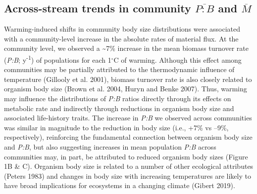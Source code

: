 \documentclass[
]{article}
\numberwithin{equation}
\begin{document}
\hypertarget{across-stream-trends-in-community-overlinepb-and-overlinem}{%
\subsection{\texorpdfstring{Across-stream trends in community
\(\overline{P:B}\) and
\(\overline{M}\)}{Across-stream trends in community \textbackslash overline\{P:B\} and \textbackslash overline\{M\}}}\label{across-stream-trends-in-community-overlinepb-and-overlinem}}

Warming-induced shifts in community body size distributions were
associated with a community-level increase in the absolute rates of
material flux. At the community level, we observed a \textasciitilde7\%
increase in the mean biomass turnover rate (\emph{P:B};
y\textsuperscript{-1}) of populations for each 1\(^\circ\)C of warming.
Although this effect among communities may be partially attributed to
the thermodynamic influence of temperature (Gillooly et al. 2001),
biomass turnover rate is also closely related to organism body size
(Brown et al. 2004, Huryn and Benke 2007). Thus, warming may influence
the distributions of \emph{P:B} ratios directly through its effects on
metabolic rate and indirectly through reductions in organism body size
and associated life-history traits. The increase in \emph{P:B} we
observed across communities was similar in magnitude to the reduction in
body size (i.e., +7\% vs --9\%, respectively), reinforcing the
fundamental connection between organism body size and \emph{P:B}, but
also suggesting increases in mean population \emph{P:B} across
communities may, in part, be attributed to reduced organism body sizes
(Figure 1B \& C). Organism body size is related to a number of other
ecological attributes (Peters 1983) and changes in body size with
increasing temperatures are likely to have broad implications for
ecosystems in a changing climate (Gibert 2019).
\end{document}
